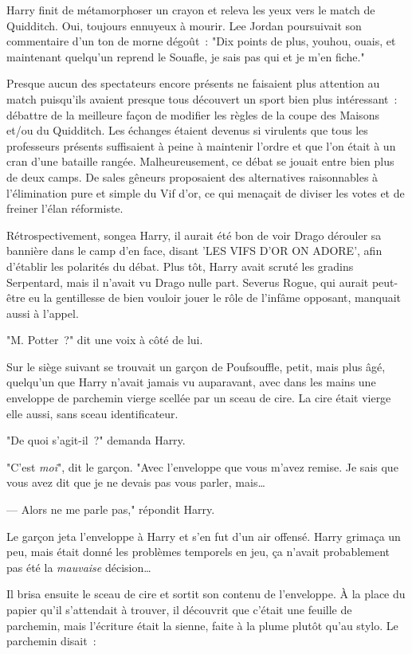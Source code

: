 Harry finit de métamorphoser un crayon et releva les yeux vers le match de Quidditch. Oui, toujours ennuyeux à mourir. Lee Jordan poursuivait son commentaire d'un ton de morne dégoût~: "Dix points de plus, youhou, ouais, et maintenant quelqu'un reprend le Souafle, je sais pas qui et je m'en fiche."

Presque aucun des spectateurs encore présents ne faisaient plus attention au match puisqu'ils avaient presque tous découvert un sport bien plus intéressant~: débattre de la meilleure façon de modifier les règles de la coupe des Maisons et/ou du Quidditch. Les échanges étaient devenus si virulents que tous les professeurs présents suffisaient à peine à maintenir l'ordre et que l'on était à un cran d'une bataille rangée. Malheureusement, ce débat se jouait entre bien plus de deux camps. De sales gêneurs proposaient des alternatives raisonnables à l'élimination pure et simple du Vif d'or, ce qui menaçait de diviser les votes et de freiner l'élan réformiste.

Rétrospectivement, songea Harry, il aurait été bon de voir Drago dérouler sa bannière dans le camp d'en face, disant 'LES VIFS D'OR ON ADORE', afin d'établir les polarités du débat. Plus tôt, Harry avait scruté les gradins Serpentard, mais il n'avait vu Drago nulle part. Severus Rogue, qui aurait peut-être eu la gentillesse de bien vouloir jouer le rôle de l'infâme opposant, manquait aussi à l'appel.

"M. Potter~?" dit une voix à côté de lui.

Sur le siège suivant se trouvait un garçon de Poufsouffle, petit, mais plus âgé, quelqu'un que Harry n'avait jamais vu auparavant, avec dans les mains une enveloppe de parchemin vierge scellée par un sceau de cire. La cire était vierge elle aussi, sans sceau identificateur.

"De quoi s'agit-il~?" demanda Harry.

"C'est \emph{moi}", dit le garçon. "Avec l'enveloppe que vous m'avez remise. Je sais que vous avez dit que je ne devais pas vous parler, mais…

--- Alors ne me parle pas," répondit Harry.

Le garçon jeta l'enveloppe à Harry et s'en fut d'un air offensé. Harry grimaça un peu, mais était donné les problèmes temporels en jeu, ça n'avait probablement pas été la \emph{mauvaise} décision…

Il brisa ensuite le sceau de cire et sortit son contenu de l'enveloppe. À la place du papier qu'il s'attendait à trouver, il découvrit que c'était une feuille de parchemin, mais l'écriture était la sienne, faite à la plume plutôt qu'au stylo. Le parchemin disait~:

